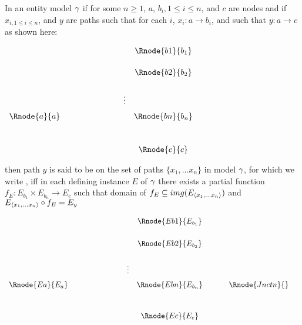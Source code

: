 \begin{definition} %
In an entity model $\gamma$  
if for some $n \geq 1$, $a$, $b_{i}, 1 \leq i \leq n$,  and $c$ are nodes and 
if  $x_{i, 1 \leq i \leq n}$, and $y$ are paths such
that for each $i$, $x_i : a \rightarrow b_i$, and such that $y: a \rightarrow c$ 
as shown here:
\setlength{\arraycolsep}{.2cm}
\begin{center}
$
\begin{array}{cp{2cm}cc}
             & &         & \Rnode{b1}{b_1} \\ [0.5cm]
						 & &         & \Rnode{b2}{b_2} \\ [0.6cm]
						 & & \vdots  &                 \\ [0.2cm]
\Rnode{a}{a} & &         & \Rnode{bn}{b_n} \\ [1.0cm]
             & &         & \Rnode{c}{c}   \\
\end{array}
$
\end{center}

\noindent 
then path $y$ is said to be  on the set of paths $\{x_1,...x_n\}$ in model $\gamma$, 
for which  we write  ,
iff
 in each defining instance $E$ of $\gamma$ there exists a  partial 
function $f_E: E_{b_1} \times E_{b_n} \rightarrow E_c$ 
\noindent such that 
domain of $f_E \subseteq img(E_{\langle x_1,... x_n \rangle})$ 
and  
$E_{\langle x_1,...x_n\rangle} \circ f_E = E_y$ 
\begin{center}
$
\begin{array}{cp{2cm}ccp{0.5cm}cc}
						    & &         & \Rnode{Eb1}{E_{b_1}}& &                            &        \\ [0.6cm]
						    & &         & \Rnode{Eb2}{E_{b_2}}& &                            &        \\ [0.6cm]
						    & &\vdots  &                      & &                            &        \\ [0.2cm]												
\Rnode{Ea}{E_a} & &         & \Rnode{Ebn}{E_{b_n}}& & \Rnode{Jnctn}{}&  \\ [1.0cm]
						    & &         & \Rnode{Ec}{{E_c}}   & &                            &        \\
\end{array}
$
\end{center}
\end{definition}

